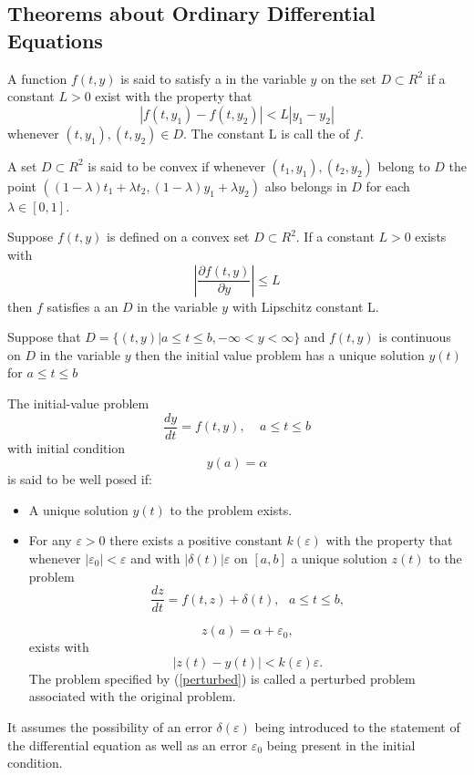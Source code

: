 \subsection{Theorems about Ordinary Differential Equations}
\begin{definition}
A function $f(t,y)$ is said to satisfy a \textbf{} in the variable $y$ on 
the set $D \subset R^2$ if a constant $L>0$ exist with the property that
\[|f(t,y_1)-f(t,y_2)| < L|y_1-y_2| \]
whenever $(t,y_1),(t,y_2) \in D$.  The constant L is call the 
of $f$.
\end{definition}
\begin{definition}
A set $D\subset R^2$ is said to be convex if whenever $(t_1,y_1),(t_2,y_2)$ belong
to $D$ the point $((1-\lambda)t_1+\lambda t_2, (1-\lambda)y_1+\lambda y_2)$ also
belongs in $D$ for each $\lambda \in [0,1]$.
\end{definition}
\begin{theorem}
Suppose $f(t,y)$ is defined on a convex set $D \subset R^2$. If a constant
$L>0$ exists with
\[\left|\frac{\partial f(t,y)}{\partial y}\right|\leq L \]
then $f$ satisfies a  an $D$ in the variable $y$ with
Lipschitz constant L.
\end{theorem}
\begin{theorem}
Suppose that
$D= \{(t,y) | a\leq t \leq b, -\infty <y < \infty \}$
and $f(t,y)$ is continuous on $D$ in the variable $y$ then the initial value
problem has a unique solution $y(t)$ for $a\leq t \leq b$
\end{theorem}
\begin{definition}
The initial-value problem 
\[\frac{dy}{dt}=f(t,y), \ \ \ \ \  a\leq t \leq b\]
with initial condition
\[y(a) = \alpha \]
is said to be well posed if:
\begin{itemize}
\item
A unique solution $y(t)$ to the problem exists.
\item
For any $\varepsilon >0$ there exists a positive constant $k(\varepsilon)$
with the property that whenever $|\varepsilon_0| < \varepsilon$ and with
$|\delta(t)| \varepsilon$ on $[a,b]$ a unique solution $z(t)$ to the problem
\begin{equation} 
\label{perturbed}
\frac{dz}{dt}=f(t,z)+\delta(t), \ \ \  a\leq t \leq b, \end{equation}

\[z(a)=\alpha +\varepsilon_0, \]
exists with
\[ |z(t) - y(t) | < k(\varepsilon)\varepsilon. \]
The problem specified by (\ref{perturbed}) is called a perturbed problem associated
with the original problem.
\end{itemize}
It assumes the possibility of an error $\delta(\varepsilon)$ being introduced to
the statement of the differential equation as well as an error $\varepsilon_0$
being present in the initial condition.

\end{definition}
